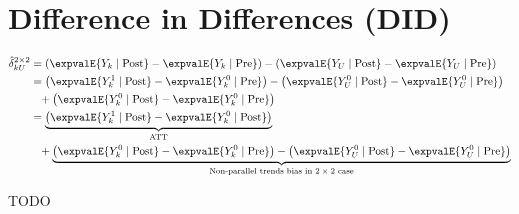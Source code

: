 
\section{Difference in Differences (DID)}
\label{cause:DID}

\begin{subequations} \label{eq:cause:DID:2x2}
\begin{align}
\hat{\delta}_{kU}^{2 \times 2} &= \left( \expvalE{Y_{k} \mid \text{Post}} - \expvalE{Y_{k} \mid \text{Pre}} \right)
- \left( \expvalE{Y_{U} \mid \text{Post}} - \expvalE{Y_{U} \mid \text{Pre}} \right) \label{eq:cause:DID:2x2:def} \\
&= \left( \expvalE{Y_{k}^{1} \mid \text{Post}} - \expvalE{Y_{k}^{0} \mid \text{Pre}} \right)
- \left( \expvalE{Y_{U}^{0} \mid \text{Post}} - \expvalE{Y_{U}^{0} \mid \text{Pre}} \right) \label{eq:cause:DID:2x2:expand} \\
&\hphantom{=} + \left( \expvalE{Y_{k}^{0} \mid \text{Post}} - \expvalE{Y_{k}^{0} \mid \text{Pre}} \right) \label{eq:cause:DID:2x2:add_zero} \\
&= \underbrace{\left( \expvalE{Y_{k}^{1} \mid \text{Post}} - \expvalE{Y_{k}^{0} \mid \text{Post}} \right)}_{\text{ATT}} \label{eq:cause:DID:2x2:ATT} \\
&\hphantom{=} + \underbrace{
\left( \expvalE{Y_{k}^{0} \mid \text{Post}} - \expvalE{Y_{k}^{0} \mid \text{Pre}} \right)
- \left( \expvalE{Y_{U}^{0} \mid \text{Post}} - \expvalE{Y_{U}^{0} \mid \text{Pre}} \right)
}_{\text{Non-parallel trends bias in $2\times 2$ case}} \label{eq:cause:DID:2x2:nonparallel_trends_bias}
\end{align}
\end{subequations}

TODO



